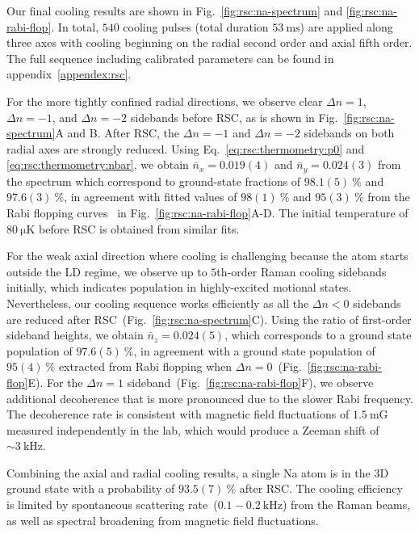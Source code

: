 Our final cooling results are shown in Fig.~\ref{fig:rsc:na-spectrum} and
\ref{fig:rsc:na-rabi-flop}.
In total, $540$ cooling pulses (total duration $53~\mathrm{ms}$) are applied
along three axes with cooling beginning on the radial second order and axial fifth order.
The full sequence including calibrated parameters can be found in appendix~\ref{appendex:rsc}.

For the more tightly confined radial directions,
we observe clear $\Delta n=1$, $\Delta n=-1$, and $\Delta n=-2$ sidebands before RSC,
as is shown in Fig.~\ref{fig:rsc:na-spectrum}A and B.
After RSC, the $\Delta n=-1$ and $\Delta n=-2$ sidebands
on both radial axes are strongly reduced.
Using Eq.~\ref{eq:rsc:thermometry:p0} and \ref{eq:rsc:thermometry:nbar},
we obtain $\bar{n}_x=0.019(4)$ and $\bar{n}_y=0.024(3)$ from the spectrum which
correspond to ground-state fractions of $98.1(5)~\mathrm{\%}$ and $97.6(3)~\mathrm{\%}$,
in agreement with fitted values of $98(1)~\mathrm{\%}$ and $95(3)~\mathrm{\%}$
from the Rabi flopping curves~\cite{meekhof_generation_1996}
in Fig.~\ref{fig:rsc:na-rabi-flop}A-D.
The initial temperature of $80~\mathrm{\mu K}$ before RSC is obtained from similar fits.

For the weak axial direction
where cooling is challenging because the atom starts outside the LD regime,
we observe up to $5$th-order Raman cooling sidebands initially,
which indicates population in highly-excited motional states.
Nevertheless, our cooling sequence works efficiently
as all the $\Delta n<0$ sidebands are reduced after RSC~(Fig.~\ref{fig:rsc:na-spectrum}C).
Using the ratio of first-order sideband heights, we obtain $\bar{n}_z=0.024(5)$,
which corresponds to a ground state population of $97.6(5)~\mathrm{\%}$,
in agreement with a ground state population of $95(4)~\mathrm{\%}$ extracted from Rabi flopping
when $\Delta n=0$~(Fig.~\ref{fig:rsc:na-rabi-flop}E).
For the $\Delta n=1$ sideband~(Fig.~\ref{fig:rsc:na-rabi-flop}F),
we observe additional decoherence that is more pronounced due to the slower Rabi frequency.
The decoherence rate is consistent with magnetic field fluctuations of $1.5~\mathrm{mG}$
measured independently in the lab, which would produce a Zeeman shift of $\sim 3~\mathrm{kHz}$.

Combining the axial and radial cooling results,
a single Na atom is in the 3D ground state with a probability of $93.5(7)~\mathrm{\%}$ after RSC.
The cooling efficiency is limited by spontaneous scattering rate~($0.1-0.2~\mathrm{kHz}$)
from the Raman beams, as well as spectral broadening from magnetic field fluctuations.

